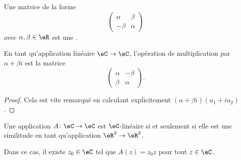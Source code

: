 \begin{definition}
	Une matrice de la forme
	\begin{equation}
		\begin{pmatrix}
			\alpha & \beta  \\
			-\beta & \alpha
		\end{pmatrix}
	\end{equation}
	avec \( \alpha,\beta\in \eR\) est une .
\end{definition}

\begin{lemma}       \label{LEMooJNFEooZCbJMo}
	En tant qu'application linéaire \( \eC\to \eC\), l'opération de multiplication par \( \alpha+\beta i\) est la matrice
	\begin{equation}
		\begin{pmatrix}
			\alpha & -\beta \\
			\beta  & \alpha
		\end{pmatrix}.
	\end{equation}
\end{lemma}

\begin{proof}
	Cela est vite remarqué en calculant explicitement \( (\alpha+\beta i)(u_1+iu_2)\).
\end{proof}

\begin{lemma}       \label{LEMooKIOZooEUxfsB}
	Une application \( A\colon \eC\to \eC\) est \( \eC\)-linéaire si et seulement si elle est une similitude en tant qu'application \( \eR^2\to \eR^2\).

	Dans ce cas, il existe \( z_0\in \eC\) tel que \( A(z)=z_0z\) pour tout \( z\in \eC\).
\end{lemma}

